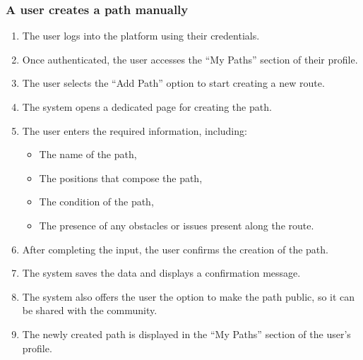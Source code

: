 \subsubsection*{A user creates a path manually}
\begin{enumerate}
    \item The user logs into the platform using their credentials.
    \item Once authenticated, the user accesses the “My Paths” section of their profile.
    \item The user selects the “Add Path” option to start creating a new route.
    \item The system opens a dedicated page for creating the path.
    \item The user enters the required information, including:
        \begin{itemize}
            \item The name of the path,
            \item The positions that compose the path,
            \item The condition of the path,
            \item The presence of any obstacles or issues present along the route.
        \end{itemize}
    \item After completing the input, the user confirms the creation of the path.
    \item The system saves the data and displays a confirmation message.
    \item The system also offers the user the option to make the path public, so it can be shared with the community.
    \item The newly created path is displayed in the “My Paths” section of the user’s profile.
\end{enumerate}
